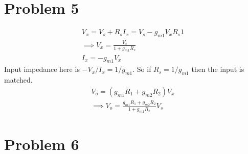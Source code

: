 \documentclass{article}
\begin{document}
\section*{\hfil Problem 5}
\begin{gather*}
	V_x = V_s + R_sI_x = V_s - g_{m1}V_xR_s1\\
	\implies V_x = \frac{V_s}{1+g_{m1}R_s}\\
	I_x = -g_{m1}V_x
\end{gather*}
Input impedance here is $-V_x/I_x = 1/g_{m1}$. So if $R_s = 1/g_{m1}$ then the input is matched.
\begin{gather*}
	V_o = (g_{m1}R_1 + g_{m2}R_2)V_x\\
	\implies V_o = \frac{g_{m1}R_1 + g_{m2}R_2}{1+g_{m1}R_s}V_s
\end{gather*}
\section*{\hfil Problem 6}
\end{document}

